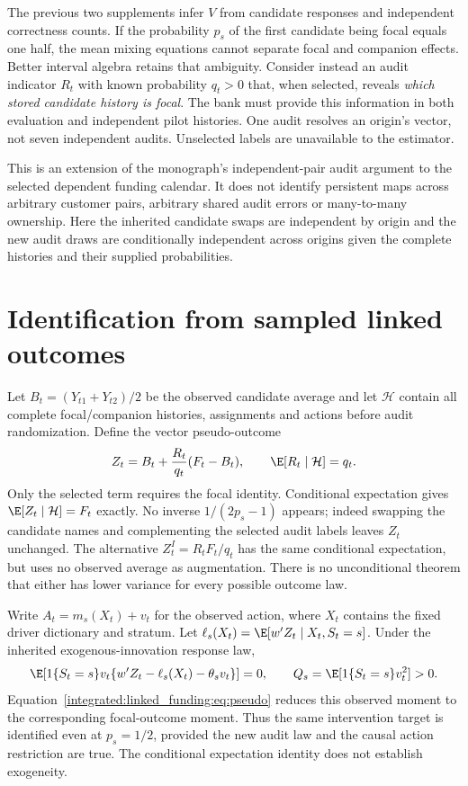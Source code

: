 The previous two supplements infer $V$ from candidate responses and independent
correctness counts. If the probability $p_s$ of the first candidate being
focal equals one half, the mean mixing equations cannot separate focal and
companion effects. Better interval algebra retains that ambiguity. Consider
instead an audit indicator $R_t$ with known probability $q_t>0$ that, when
selected, reveals \emph{which stored candidate history is focal}. The bank
must provide this information in both evaluation and independent pilot
histories. One audit resolves an origin's vector, not seven independent
audits. Unselected labels are unavailable to the estimator.

This is an extension of the monograph's independent-pair audit argument to
the selected dependent funding calendar. It does not identify persistent
maps across arbitrary customer pairs, arbitrary shared audit errors or
many-to-many ownership. Here the inherited candidate swaps are independent
by origin and the new audit draws are conditionally independent across
origins given the complete histories and their supplied probabilities.

\section{Identification from sampled linked outcomes}

Let $B_t=(Y_{t1}+Y_{t2})/2$ be the observed candidate average and let
$\mathcal H$ contain all complete focal/companion histories, assignments and
actions before audit randomization. Define the vector pseudo-outcome
\begin{equation}
 Z_t=B_t+\frac{R_t}{q_t}(F_t-B_t),\qquad
 \E[R_t\mid\mathcal H]=q_t.\label{integrated:linked_funding:eq:pseudo}
\end{equation}
Only the selected term requires the focal identity. Conditional expectation
gives $\E[Z_t\mid\mathcal H]=F_t$ exactly. No inverse $1/(2p_s-1)$ appears;
indeed swapping the candidate names and complementing the selected audit
labels leaves $Z_t$ unchanged. The alternative $Z_t^{I}=R_tF_t/q_t$ has the
same conditional expectation, but uses no observed average as augmentation.
There is no unconditional theorem that either has lower variance for every
possible outcome law.

Write $A_t=m_s(X_t)+v_t$ for the observed action, where $X_t$ contains the
fixed driver dictionary and stratum. Let
$\ell_s(X_t)=\E[w'Z_t\mid X_t,S_t=s]$.
Under the inherited exogenous-innovation response law,
\begin{equation}
 \E\!\left[1\{S_t=s\}v_t
   \{w'Z_t-\ell_s(X_t)-\theta_sv_t\}\right]=0,
 \qquad Q_s=\E[1\{S_t=s\}v_t^2]>0.\label{integrated:linked_funding:eq:score}
\end{equation}
Equation~\eqref{integrated:linked_funding:eq:pseudo} reduces this observed moment to the corresponding
focal-outcome moment. Thus the same intervention target is identified even
at $p_s=1/2$, provided the new audit law and the causal action restriction
are true. The conditional expectation identity does not establish exogeneity.

